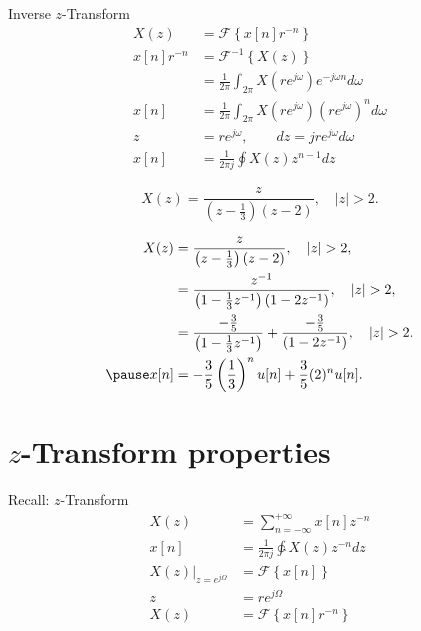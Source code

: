 \begin{frame}{Inverse $z$-Transform}
    \begin{align*}
        X(z) &= \mathcal{F}\left\{x[n]r^{-n}\right\}\\
        x[n]r^{-n} &= \mathcal{F}^{-1}\left\{X(z)\right\}\\
        &= \frac{1}{2\pi}\int_{2\pi}X(re^{j\omega}) e^{-j\omega n}d\omega\\
        x[n] &= \frac{1}{2\pi}\int_{2\pi}X(re^{j\omega})\left(re^{j\omega}\right)^nd\omega\\
        z &= re^{j\omega}, \qquad dz = jre^{j\omega}d\omega\\
        x[n] &= \frac{1}{2\pi j} \oint X(z)z^{n-1}dz
    \end{align*}
\end{frame}


\begin{frame}
    \begin{example}
        \begin{equation*}
            X(z) = \frac{z}{\left(z-\frac{1}{3}\right)(z-2)}, \quad |z|>2.
        \end{equation*}
    \end{example}
    \pause
    {
            \begin{align*}
                X(z) &= \frac{z}{\left(z-\frac{1}{3}\right)(z-2)}, \quad |z|>2,\\
                &= \frac{z^{-1}}{\left(1-\frac{1}{3}z^{-1}\right)(1-2z^{-1})}, \quad |z|>2,\\
                &= \frac{-\frac{3}{5}}{\left(1-\frac{1}{3}z^{-1}\right)} + \frac{-\frac{3}{5}}{(1-2z^{-1})}, \quad |z|>2.\\
                \pause
                x[n] &=  -\frac{3}{5} \left(\frac{1}{3}\right)^nu[n] + \frac{3}{5} (2)^n u[n].\\
            \end{align*}

    }
\end{frame}




\section{$z$-Transform properties}
\begin{frame}{Recall: $z$-Transform}
    \begin{align*}
        X(z) &= \sum_{n=-\infty}^{+\infty}x[n]z^{-n}\\
        x[n] &= \frac{1}{2\pi j}\ointctrclockwise X(z)z^{-n}dz\\
        \left.X(z)\right|_{z=e^{j\Omega}} &= \mathcal{F}\left\{x[n]\right\}\\
        z &= re^{j\Omega}\\
        X(z) &= \mathcal{F}\left\{x[n]r^{-n}\right\}
    \end{align*}
\end{frame}




